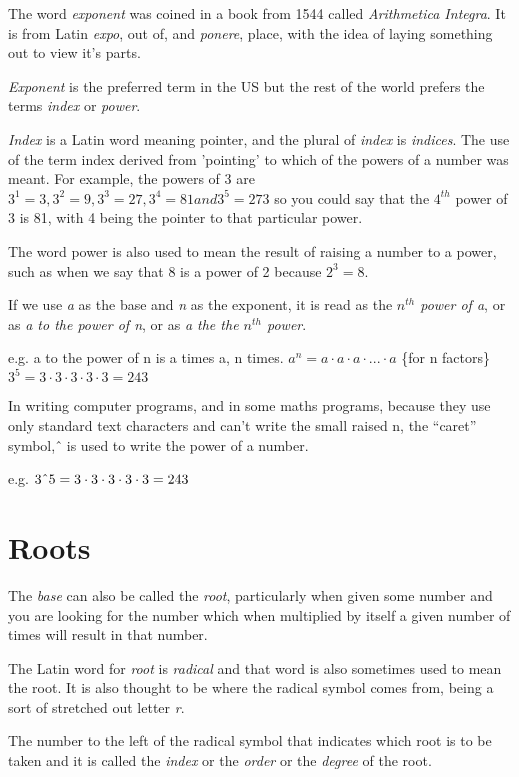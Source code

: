 \documentclass{article}
\begin{document}
The word \textit{exponent} was coined in a book from 1544 called \textit{Arithmetica Integra}. It is from Latin \textit{expo}, out of, and \textit{ponere}, place, with the idea of laying something out to view it's parts.

\textit{Exponent} is the preferred term in the US but the rest of the world prefers the terms \textit{index} or \textit{power}.

\textit{Index} is a Latin word meaning pointer, and the plural of \textit{index} is \textit{indices}. The use of the term index derived from 'pointing' to which of the powers of a number was meant. For example, the powers of 3 are $3^1=3, 3^2=9, 3^3=27, 3^4=81 and 3^5=273$ so you could say that the $4^{th}$ power of 3 is 81, with 4 being the pointer to that particular power.

The word power is also used to mean the result of raising a number to a power, such as when we say that 8 is a power of 2 because $2^3=8$.

If we use \textit{a} as the base and \textit{n} as the exponent, it is read as the \textit{$n^{th}$ power of a}, or as \textit{a to the power of n}, or as \textit{a the the $n^{th}$ power}.

e.g.	a to the power of n is a times a, n times.
	${a^n = a\cdot a\cdot a \cdot ... \cdot a}$ \{for n factors\}
	${3^5 = 3 \cdot 3 \cdot 3 \cdot 3 \cdot 3 = 243}$

In writing computer programs, and in some maths programs, because they use only standard text characters and can’t write the small raised n, the “caret” symbol, \^\, is used to write the power of a number.

e.g.	$3 \string^ 5 = 3 \cdot 3 \cdot 3 \cdot 3 \cdot 3 = 243$

\section{Roots}

The \textit{base} can also be called the \textit{root}, particularly when given some number and you are looking for the number which when multiplied by itself a given number of times will result in that number.

The Latin word for \textit{root} is \textit{radical} and that word is also sometimes used to mean the root. It is also thought to be where the radical symbol \textsurd \enspace comes from, being a sort of stretched out letter \textit{r}.

The number to the left of the radical symbol that indicates which root is to be taken and it is called the \textit{index} or the \textit{order} or the \textit{degree} of the root.
\end{document}
